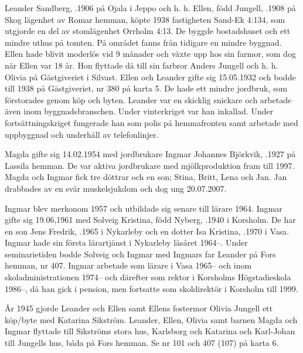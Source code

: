 Leander Sandberg, .1906 på Ojala i Jeppo och h. h. Ellen, född Jungell, .1908 på Skog lägenhet av Romar hemman, köpte 1938 fastigheten Sand-Ek 4:134, som utgjorde en del av stomlägenhet Orrholm 4:13. De byggde bostadshuset och ett mindre uthus på tomten. På området fanns från tidigare en mindre byggnad. Ellen hade blivit moderlös vid 9 månader och växte upp hos sin farmor, som dog när Ellen var 18 år. Hon flyttade då till sin farbror Anders Jungell och h. h. Olivia på Gästgiveriet i Silvast. Ellen och Leander gifte sig 15.05.1932 och bodde till 1938 på Gästgiveriet, nr 380 på karta 5. De hade ett mindre jordbruk, som förstorades genom köp och byten. Leander var en skicklig snickare och arbetade även inom byggnadsbranschen. Under vinterkriget var han inkallad. Under fortsättningskriget fungerade han som polis på hemmafronten samt arbetade med uppbyggnad och underhåll av telefonlinjer.
\begin{jhchildren}
  \item {}
  \item {}
\end{jhchildren}
Magda gifte sig 14.02.1954 med jordbrukare Ingmar Johannes Björkvik, .1927 på Lassila hemman. De var aktiva jordbrukare med mjölkproduktion fram till 1997. Magda och Ingmar fick tre döttrar och en son; Stina, Britt, Lena och Jan. Jan drabbades av en svår muskelsjukdom och dog ung 20.07.2007.

Ingmar blev merkonom 1957 och utbildade sig senare till lärare 1964. Ingmar gifte sig 19.06,1961 med Solveig Kristina, född Nyberg, .1940 i Korsholm. De har en son Jens Fredrik, .1965 i Nykarleby och en dotter Isa Kristina, .1970 i Vasa. Ingmar hade sin första lärartjänst i Nykarleby läsåret 1964--. Under seminarietiden bodde Solveig och Ingmar med Ingmars far Leander på Fors hemman, nr 407. Ingmar arbetade som lärare i Vasa 1965-- och inom skoladministrationen 1974-- och därefter som rektor i Korsholms Högstadieskola 1986--, då han gick i pension, men fortsatte som skoldirektör i Korsholm till 1999.

År 1945 gjorde Leander och Ellen samt Ellens fostermor Olivia Jungell ett köp/byte med Katarina Sikström. Leander, Ellen, Olivia samt barnen Magda och Ingmar flyttade till Sikströms stora hus, Karlsborg och Katarina och Karl-Johan till Jungells hus, båda på Fors hemman. Se nr 101 och 407 (107) på karta 6.


